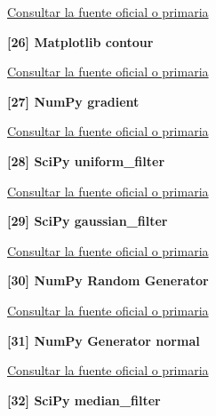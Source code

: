\href{https://numpy.org/doc/stable/reference/generated/numpy.percentile.html}{Consultar la fuente oficial o primaria}\par\medskip

\hypertarget{refR26}{}\textbf{[26] Matplotlib contour}\par

\href{https://matplotlib.org/stable/api/_as_gen/matplotlib.pyplot.contour.html}{Consultar la fuente oficial o primaria}\par\medskip

\hypertarget{refR27}{}\textbf{[27] NumPy gradient}\par

\href{https://numpy.org/doc/stable/reference/generated/numpy.gradient.html}{Consultar la fuente oficial o primaria}\par\medskip

\hypertarget{refR28}{}\textbf{[28] SciPy uniform\_filter}\par

\href{https://docs.scipy.org/doc/scipy/reference/generated/scipy.ndimage.uniform_filter.html}{Consultar la fuente oficial o primaria}\par\medskip

\hypertarget{refR29}{}\textbf{[29] SciPy gaussian\_filter}\par

\href{https://docs.scipy.org/doc/scipy/reference/generated/scipy.ndimage.gaussian_filter.html}{Consultar la fuente oficial o primaria}\par\medskip

\hypertarget{refR30}{}\textbf{[30] NumPy Random Generator}\par

\href{https://numpy.org/doc/stable/reference/random/generator.html}{Consultar la fuente oficial o primaria}\par\medskip

\hypertarget{refR31}{}\textbf{[31] NumPy Generator normal}\par

\href{https://numpy.org/doc/stable/reference/random/generated/numpy.random.Generator.normal.html}{Consultar la fuente oficial o primaria}\par\medskip

\hypertarget{refR32}{}\textbf{[32] SciPy median\_filter}\par

